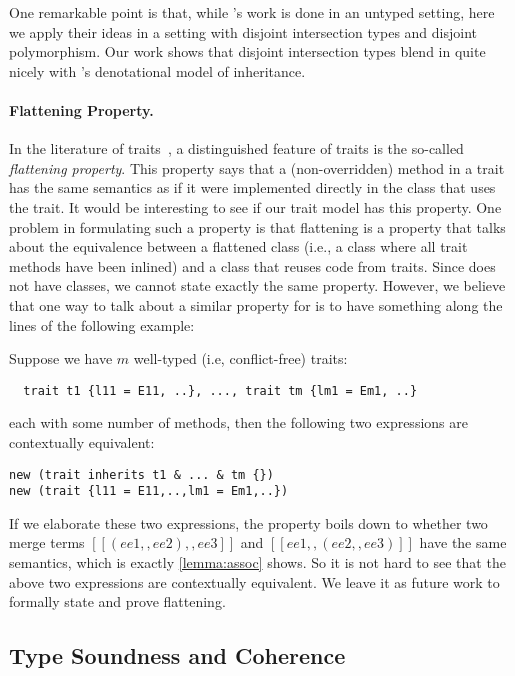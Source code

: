 One remarkable point is that, while \citeauthor{cook1989denotational}'s work is done in
an untyped setting, here we apply their ideas in a setting with
disjoint intersection types and disjoint polymorphism. Our work shows that
disjoint intersection types blend in quite nicely with \citeauthor{cook1989denotational}'s
denotational model of inheritance.

\paragraph{Flattening Property.}

In the literature of traits~\citep{Ducasse_2006, scharli2003traits, JOT:issue_2006_05/article4},
a distinguished feature of traits is the
so-called \textit{flattening property}. This property says that a (non-overridden) method in a
trait has the same semantics as if it were implemented directly in the class
that uses the trait. It would be interesting to see if our trait model has this
property. One problem in formulating such a property is that flattening is a
property that talks about the equivalence between a flattened class (i.e., a
class where all trait methods have been inlined) and a class that reuses code
from traits. Since \sedel does not have classes, we cannot state exactly the same
property. However, we believe that one way to talk about a similar property for \sedel is to have something
along the lines of the following example:
\begin{example}[Flattening]
Suppose we have $m$ well-typed (i.e, conflict-free) traits:
\begin{lstlisting}
  trait t1 {l11 = E11, ..}, ..., trait tm {lm1 = Em1, ..}
\end{lstlisting}
each with some number of methods, then the following two expressions are contextually equivalent:
\begin{lstlisting}
new (trait inherits t1 & ... & tm {})
new (trait {l11 = E11,..,lm1 = Em1,..})
\end{lstlisting}
\end{example}
If we elaborate these two expressions, the property boils down to whether two
merge terms $[[(ee1 ,, ee2) ,, ee3]]$ and $[[ee1 ,, (ee2 ,, ee3)]]$ have the
same semantics, which is exactly \cref{lemma:assoc} shows. So it is not hard to
see that the above two expressions are contextually equivalent. We leave it as
future work to formally state and prove flattening.

\subsection{Type Soundness and Coherence}

